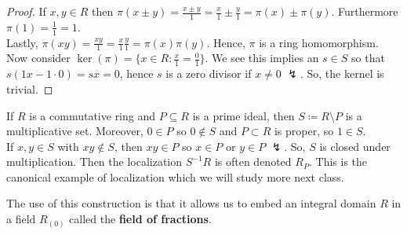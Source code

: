 \begin{proof}
	If \(x, y \in R\) then \(\pi\left( x \pm y \right) = \frac{x \pm y}{1} = \frac{x}{1} \pm \frac{y}{1} = \pi\left( x \right) \pm \pi\left( y \right) \). Furthermore \(\pi\left( 1 \right) = \frac{1}{1} = 1\).\\
	Lastly, \(\pi\left( xy \right) = \frac{xy}{1} = \frac{x}{1}\frac{y}{1} = \pi\left( x \right) \pi\left( y \right) \). Hence, \(\pi\) is a ring homomorphism. Now consider \(\ker \left( \pi \right) = \{x \in R : \frac{x}{1} = \frac{0}{1}\} \). We see this implies an \(s \in S\) so that \(s\left( 1x - 1\cdot 0 \right) = sx = 0 \), hence \(s\) is a zero divisor if \(x \neq 0\) \(\lightning\). So, the kernel is trivial.
\end{proof}
\begin{example}
	If \(R\) is a commutative ring and \(P \subseteq R\) is a prime ideal, then \(S \coloneqq R \setminus P\) is a multiplicative set. Moreover, \(0 \in P\) so \( 0 \not\in S\)  and \(P \subset R\) is proper, so \(1 \in S\).\\
	If \(x, y \in S\) with \(xy \not\in S\), then \(xy \in P\) so \(x \in P\) or \(y \in P\) \(\lightning\). So, \(S\) is closed under multiplication. Then the localization \(S^{-1} R\) is often denoted \(R_{P}\). This is the canonical example of localization which we will study more next class.
\end{example}
The use of this construction is that it allows us to embed an integral domain \(R\) in a field \(R_{\left( 0 \right) }\) called the \textbf{field of fractions}.

